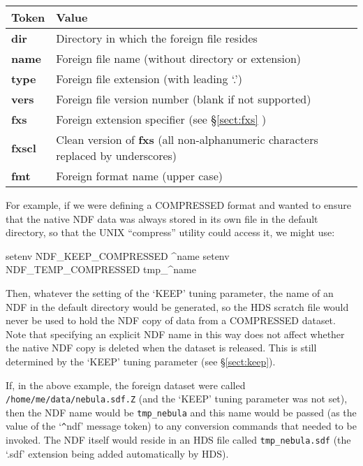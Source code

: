 \documentclass[11pt,twoside,nolof]{starlink}
\providecommand{\file}[1]{{\tt{#1}}}
\begin{document}
\begin{center}
\begin{tabular}{|l|l|}
\hline
\textbf{Token} & \textbf{Value}\\
\hline\hline
\textbf{dir}  & Directory in which the foreign file resides\\
\textbf{name} & Foreign file name (without directory or extension)\\
\textbf{type} & Foreign file extension (with leading `.')\\
\textbf{vers} & Foreign file version number (blank if not supported)\\
\textbf{fxs}  & Foreign extension specifier (see \S\ref{sect:fxs} )\\
\textbf{fxscl} & Clean version of \textbf{fxs} (all non-alphanumeric characters
replaced by underscores)\\
\textbf{fmt}  & Foreign format name (upper case)\\
\hline
\end{tabular}
\end{center}

For example, if we were defining a COMPRESSED format and wanted to
ensure that the native NDF data was always stored in its own file in
the default directory, so that the UNIX ``compress'' utility could
access it, we might use:

\begin{terminalv}
setenv NDF_KEEP_COMPRESSED ^name
setenv NDF_TEMP_COMPRESSED tmp_^name
\end{terminalv}

Then, whatever the setting of the `KEEP' tuning parameter, the name of
an NDF in the default directory would be generated, so the HDS scratch
file would never be used to hold the NDF copy of data from a
COMPRESSED dataset.  Note that specifying an explicit NDF name in this
way does not affect whether the native NDF copy is deleted when the
dataset is released. This is still determined by the `KEEP' tuning
parameter (see \S\ref{sect:keep}).

If, in the above example, the foreign dataset were called
\file{/home/me/data/nebula.sdf.Z} (and the `KEEP' tuning parameter was
not set), then the NDF name would be \file{tmp\_nebula} and this name
would be passed (as the value of the `\verb#^#ndf' message token) to
any conversion commands that needed to be invoked. The NDF itself
would reside in an HDS file called \file{tmp\_nebula.sdf} (the `.sdf'
extension being added automatically by HDS).
\end{document}
